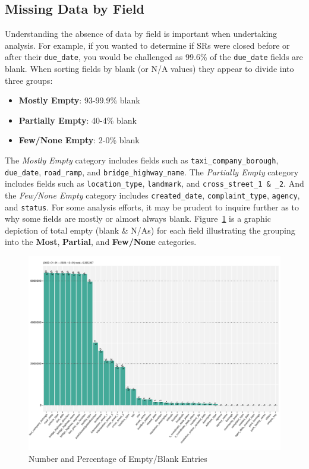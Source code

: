 \documentclass[linenumber]{jdsart}
\begin{document}
\subsection{Missing Data by Field}
\label{sec:blanks}
Understanding the absence of data by field is important 
when undertaking analysis. For example, if you wanted to 
determine if SRs were closed before or after their
\texttt{due\_date}, you would be challenged as 99.6\% of the
\texttt{due\_date} fields are blank. When sorting fields by
blank (or N/A values) they appear to divide into three groups:

\begin{itemize}[left=1.5em]
    \item \textbf{Mostly Empty}: 93-99.9\% blank 
    \item \textbf{Partially Empty}: 40-4\% blank
    \item \textbf{Few/None Empty}: 2-0\% blank
\end{itemize}

The \textit{Mostly Empty} category includes fields such as
\texttt{taxi\_company\_borough}, \texttt{due\_date},
\texttt{road\_ramp}, and \texttt{bridge\_highway\_name}.
The \textit{Partially Empty} category includes fields such as
\texttt{location\_type}, \texttt{landmark}, 
and \texttt{cross\_street\_1 \& \_2}. And the \textit{Few/None Empty} 
category includes \texttt{created\_date}, \texttt{complaint\_type},
\texttt{agency}, and \texttt{status}. For some analysis efforts, it may be
prudent to inquire further as to why some fields are 
mostly or almost always blank. Figure~\ref{fig:blank_fields} is 
a graphic depiction of total empty (blank \& N/As) for each 
field illustrating the grouping into 
the \textbf{Most}, \textbf{Partial}, and \textbf{Few/None} categories.

\begin{figure}[tbp]
	\centering
  	\includegraphics[width=\textwidth]{BlankFields.pdf}
	\caption{Number and Percentage of Empty/Blank Entries}
	\label{fig:blank_fields}
\end{figure}
\end{document}
